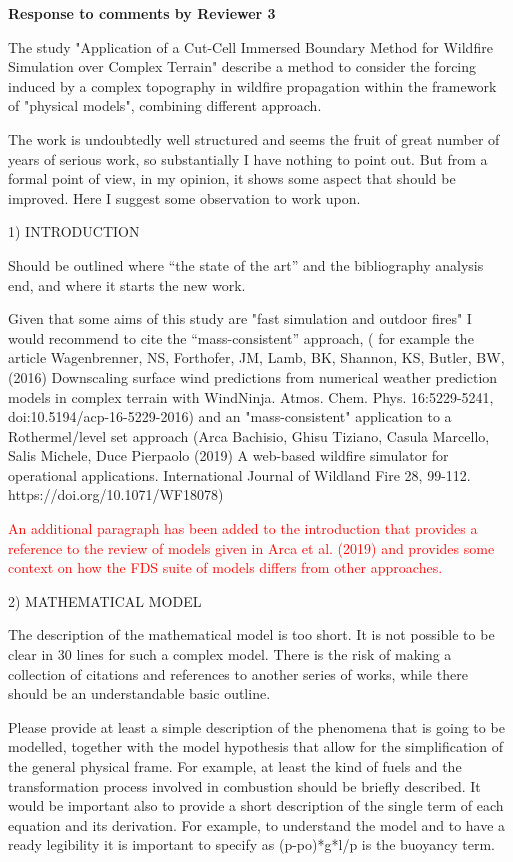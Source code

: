\documentclass[12pt]{article}
\newcommand\hl[1]{\textcolor{red}{#1}}
\begin{document}
\begin{center}
{\bf Response to comments by Reviewer 3}
\end{center}

The study "Application of a Cut-Cell Immersed Boundary Method for Wildfire Simulation over Complex Terrain" describe a method to consider the forcing induced by a complex topography in wildfire propagation within the framework of "physical models", combining different approach. 

The work is undoubtedly well structured and seems the fruit of great number of years of serious work, so substantially I have nothing to point out. But from a formal point of view, in my opinion, it shows some aspect that should be improved. Here I suggest some observation to work upon. 

1)	INTRODUCTION

Should be outlined where ``the state of the art'' and the bibliography analysis end, and where it starts the new work.

Given that some aims of this study are "fast simulation and outdoor fires" I would recommend to cite
the ``mass-consistent'' approach, ( for example the article Wagenbrenner, NS, Forthofer, JM, Lamb, BK, Shannon, KS, Butler, BW, (2016) Downscaling surface wind predictions from numerical weather prediction models in complex terrain with WindNinja. Atmos. Chem. Phys. 16:5229-5241, doi:10.5194/acp-16-5229-2016) and an "mass-consistent" application to a Rothermel/level set approach (Arca Bachisio, Ghisu Tiziano, Casula Marcello, Salis Michele, Duce Pierpaolo (2019) A web-based wildfire simulator for operational
applications. International Journal of Wildland Fire 28, 99-112. https://doi.org/10.1071/WF18078)

\hl{An additional paragraph has been added to the introduction that provides a reference to the review of models given in Arca et al. (2019) and provides some context on how the FDS suite of models differs from other approaches.}

2) MATHEMATICAL MODEL

The description of the mathematical model is too short. It is not possible to be clear in 30 lines for such a complex model. There is the risk of making a collection of citations and references to another series of works, while there should be an understandable basic outline.

Please provide at least a simple description of the phenomena that is going to be modelled, together with the model hypothesis that allow for the simplification of the general physical frame. For example, at least the kind of fuels and the transformation process involved in combustion should be briefly described. It would be important also to provide a short description of the single term of each equation and its derivation. For example, to understand the model and to have a ready legibility it is important to specify as (p-po)*g*l/p is the buoyancy term. 
\end{document}
